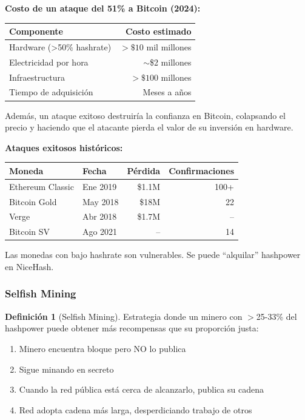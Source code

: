 \documentclass[11pt,a4paper,twoside,openright]{book}
\theoremstyle{definition}
\newtheorem{definition}{Definición}[chapter]
\theoremstyle{plain}
\theoremstyle{remark}
\begin{document}
\begin{advertencia}
\textbf{Costo de un ataque del 51\% a Bitcoin (2024):}

\begin{center}
\begin{tabular}{lr}
\toprule
\textbf{Componente} & \textbf{Costo estimado} \\
\midrule
Hardware (>50\% hashrate) & $>\$10$ mil millones \\
Electricidad por hora & $\sim$\$2 millones \\
Infraestructura & $>\$100$ millones \\
Tiempo de adquisición & Meses a años \\
\bottomrule
\end{tabular}
\end{center}

Además, un ataque exitoso destruiría la confianza en Bitcoin, colapsando el precio y haciendo que el atacante pierda el valor de su inversión en hardware.

\textbf{Ataques exitosos históricos:}

\begin{center}
\begin{tabular}{llrr}
\toprule
\textbf{Moneda} & \textbf{Fecha} & \textbf{Pérdida} & \textbf{Confirmaciones} \\
\midrule
Ethereum Classic & Ene 2019 & \$1.1M & 100+ \\
Bitcoin Gold & May 2018 & \$18M & 22 \\
Verge & Abr 2018 & \$1.7M & -- \\
Bitcoin SV & Ago 2021 & -- & 14 \\
\bottomrule
\end{tabular}
\end{center}

Las monedas con bajo hashrate son vulnerables. Se puede ``alquilar'' hashpower en NiceHash.
\end{advertencia}

\subsubsection{Selfish Mining}

\begin{definition}[Selfish Mining]
Estrategia donde un minero con $>$25-33\% del hashpower puede obtener más recompensas que su proporción justa:
\begin{enumerate}
    \item Minero encuentra bloque pero NO lo publica
    \item Sigue minando en secreto
    \item Cuando la red pública está cerca de alcanzarlo, publica su cadena
    \item Red adopta cadena más larga, desperdiciando trabajo de otros
\end{enumerate}
\end{definition}
\end{document}
